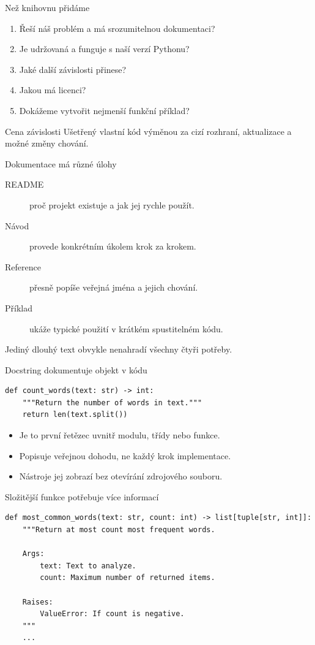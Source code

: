 \documentclass[aspectratio=169]{beamer}
\begin{document}
\begin{frame}{Než knihovnu přidáme}
  \begin{enumerate}
    \item Řeší náš problém a má srozumitelnou dokumentaci?
    \item Je udržovaná a funguje s naší verzí Pythonu?
    \item Jaké další závislosti přinese?
    \item Jakou má licenci?
    \item Dokážeme vytvořit nejmenší funkční příklad?
  \end{enumerate}
  \begin{block}{Cena závislosti}
    Ušetřený vlastní kód výměnou za cizí rozhraní, aktualizace a možné změny chování.
  \end{block}
\end{frame}

\begin{frame}{Dokumentace má různé úlohy}
  \begin{description}
    \item[README] proč projekt existuje a jak jej rychle použít.
    \item[Návod] provede konkrétním úkolem krok za krokem.
    \item[Reference] přesně popíše veřejná jména a jejich chování.
    \item[Příklad] ukáže typické použití v krátkém spustitelném kódu.
  \end{description}
  Jediný dlouhý text obvykle nenahradí všechny čtyři potřeby.
\end{frame}

\begin{frame}[fragile]{Docstring dokumentuje objekt v kódu}
\begin{lstlisting}[style=python]
def count_words(text: str) -> int:
    """Return the number of words in text."""
    return len(text.split())
\end{lstlisting}
  \begin{itemize}
    \item Je to první řetězec uvnitř modulu, třídy nebo funkce.
    \item Popisuje veřejnou dohodu, ne každý krok implementace.
    \item Nástroje jej zobrazí bez otevírání zdrojového souboru.
  \end{itemize}
\end{frame}

\begin{frame}[fragile]{Složitější funkce potřebuje více informací}
\begin{lstlisting}[style=pythonSmall]
def most_common_words(text: str, count: int) -> list[tuple[str, int]]:
    """Return at most count most frequent words.

    Args:
        text: Text to analyze.
        count: Maximum number of returned items.

    Raises:
        ValueError: If count is negative.
    """
    ...
\end{lstlisting}
\end{frame}
\end{document}
